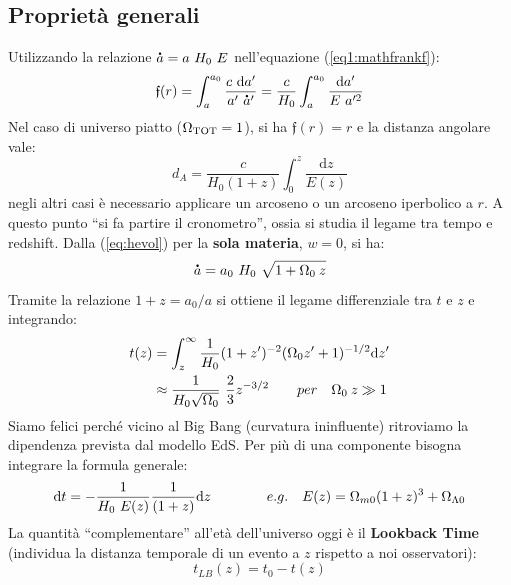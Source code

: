 \subsection{Proprietà generali}
Utilizzando la relazione $\accentset{\mbox{\large\bfseries .}}{a}= a ~H_0 ~E$ nell'equazione (\ref{eq1:mathfrankf}):
\begin{equation}
    \mathfrak{f}(r) = \int_{a}^{a_0} \frac{c ~\mathrm{d}a'}{a' ~\accentset{\mbox{\large\bfseries .}}{a}'} = \frac{c}{H_0} \int_{a}^{a_0} \frac{\mathrm{d}a'}{E ~a'^2}
\end{equation}
Nel caso di universo piatto ($\Omega_{\mathrm{TOT}}=1$), si ha $\mathfrak{f}(r)=r$ e la distanza angolare vale:
\begin{equation}
    d_A = \frac{c}{H_0 (1+z)} \int^z_0 \frac{\mathrm{d}z}{E(z)} 
\end{equation}
negli altri casi è necessario applicare un arcoseno o un arcoseno iperbolico a $r$. 
A questo punto ``si fa partire il cronometro'', ossia si studia il legame tra tempo e redshift. Dalla (\ref{eq:hevol}) per la \textbf{sola materia}, $w=0$, si ha:
\begin{equation}
\accentset{\mbox{\large\bfseries .}}{a}=a_0~H_0~\sqrt{1+ \Omega_0 \:z} \label{eq:adotsolamateria}
\end{equation}
Tramite la relazione $1+z=a_0/a$ si ottiene il legame differenziale tra $t$ e $z$ e integrando:
\begin{align}
    t(z) &=\int_z^\infty \frac{1}{H_0}(1+z')^{-2}(\Omega_0 z'+1)^{-1/2}\mathrm{d}z' \\
    & \approx  \frac{1}{H_0 \sqrt{\Omega_0}}~\frac{2}{3} z^{-3/2} \qquad per\quad \Omega_0\: z \gg 1
\end{align}
Siamo felici perché vicino al Big Bang (curvatura ininfluente) ritroviamo la dipendenza prevista dal modello EdS. Per più di una componente bisogna integrare la formula generale:
\begin{equation}
    \mathrm{d}t = - \frac{1}{H_0 ~E(z)}\frac{1}{(1+z)}\mathrm{d}z \qquad\qquad e.g. \quad E(z) = \Omega_{m0}(1+z)^3 + \Omega_{\Lambda 0}
\end{equation}
La quantità ``complementare'' all'età dell'universo oggi è il \textbf{Lookback Time} (individua la distanza temporale di un evento a $z$ rispetto a noi osservatori):
$$
t_{LB}(z) = t_0 - t(z)
$$

